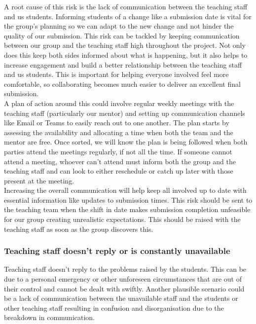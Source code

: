 A root cause of this risk is the lack of communication between the teaching staff and us students. Informing students of a change like a submission date is vital for the group’s planning so we can adapt to the new change and not hinder the quality of our submission. This risk can be tackled by keeping communication between our group and the teaching staff high throughout the project. Not only does this keep both sides informed about what is happening, but it also helps to increase engagement and build a better relationship between the teaching staff and us students. This is important for helping everyone involved feel more comfortable, so collaborating becomes much easier to deliver an excellent final submission.
\\

A plan of action around this could involve regular weekly meetings with the teaching staff (particularly our mentor) and setting up communication channels like Email or Teams to easily reach out to one another. The plan starts by assessing the availability and allocating a time when both the team and the mentor are free. Once sorted, we will know the plan is being followed when both parties attend the meetings regularly, if not all the time. If someone cannot attend a meeting, whoever can’t attend must inform both the group and the teaching staff and can look to either reschedule or catch up later with those present at the meeting.
\\

Increasing the overall communication will help keep all involved up to date with essential information like updates to submission times. This risk should be sent to the teaching team when the shift in date makes submission completion unfeasible for our group creating unrealistic expectations. This should be raised with the teaching staff as soon as the group discovers this.


\subsubsection{Teaching staff doesn't reply or is constantly unavailable}
Teaching staff doesn’t reply to the problems raised by the students. This can be due to a personal emergency or other unforeseen circumstances  that are out of their control and cannot be dealt with swiftly. Another plausible scenario could be a lack of communication between the unavailable staff and the students or other teaching staff resulting in confusion and disorganisation due to the breakdown in communication.
\\

